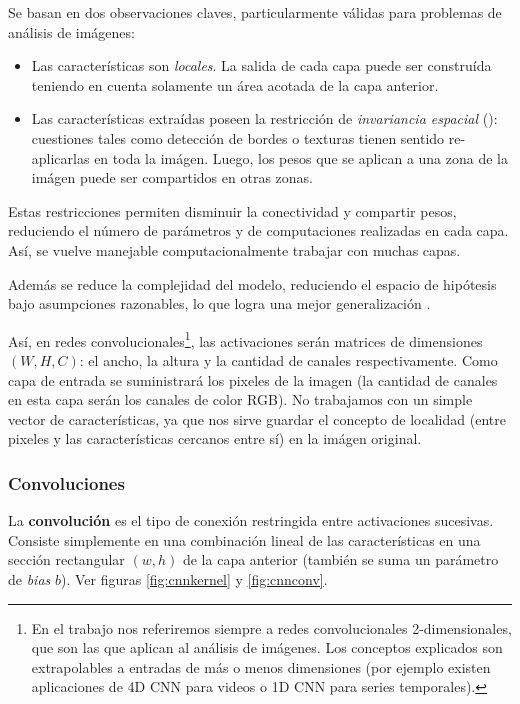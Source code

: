 Se basan en dos observaciones claves, particularmente válidas para problemas de análisis de imágenes: 
\begin{itemize}
    \item Las características son \textit{locales}.  La salida de cada capa puede ser construída teniendo en cuenta solamente un área acotada de la capa anterior.
    \item Las características extraídas poseen la restricción de \textit{invariancia espacial} (\cite{lecun-invariance-shift}): cuestiones tales como detección  de bordes o texturas tienen sentido re-aplicarlas en toda la imágen. Luego, los pesos que se aplican a una zona de la imágen puede ser compartidos en otras zonas.
\end{itemize}
Estas restricciones permiten disminuir la conectividad y compartir pesos, reduciendo el número de parámetros y de computaciones realizadas en cada capa. Así, se vuelve manejable computacionalmente trabajar con muchas capas. 

Además se reduce la complejidad del modelo, reduciendo el espacio de hipótesis bajo asumpciones razonables, lo que logra una mejor generalización \cite{hipotesis1} \cite{hipotesis2}.

Así, en redes convolucionales\footnote{En el trabajo nos referiremos siempre a redes convolucionales 2-dimensionales, que son las que aplican al análisis de imágenes. Los conceptos explicados son extrapolables a entradas de más o menos dimensiones (por ejemplo existen aplicaciones de 4D CNN para videos o 1D CNN para series temporales).}, las activaciones serán matrices de dimensiones $(W,H,C)$: el ancho, la altura y la cantidad de canales respectivamente. Como capa de entrada se suministrará los pixeles de la imagen (la cantidad de canales en esta capa serán los canales de color RGB). No trabajamos con un simple vector de características, ya que nos sirve guardar el concepto de localidad (entre pixeles y las características cercanos entre sí) en la imágen original.

\subsubsection{Convoluciones}

La \textbf{convolución} es el tipo de conexión restringida entre activaciones sucesivas. Consiste simplemente en una combinación lineal de las características en una sección rectangular $(w,h)$ de la capa anterior (también se suma un parámetro de \textit{bias} $b$). Ver figuras \ref{fig:cnnkernel} y \ref{fig:cnnconv}.

